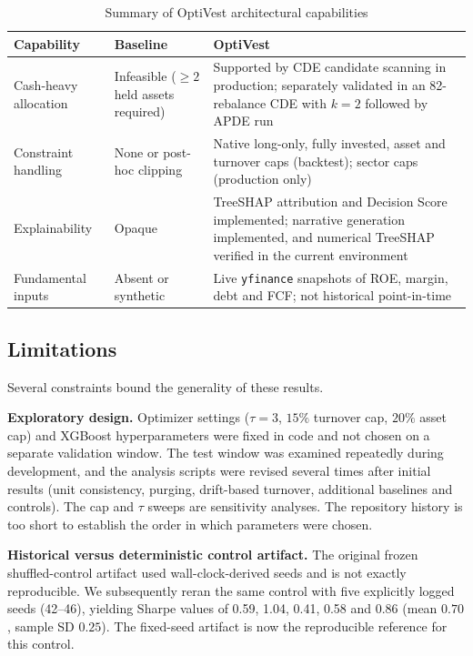 \documentclass[conference]{IEEEtran}
\begin{document}
\begin{table}[t]
\caption{Summary of OptiVest architectural capabilities}
\label{tab:capability}
\centering
\scriptsize
\setlength{\tabcolsep}{3pt}
\renewcommand{\arraystretch}{1.2}
\begin{tabular}{@{}>{\raggedright\arraybackslash}p{1.75cm}>{\raggedright\arraybackslash}p{1.75cm}>{\raggedright\arraybackslash}p{3.7cm}@{}}
\toprule
\textbf{Capability} & \textbf{Baseline} & \textbf{OptiVest} \\
\midrule
Cash-heavy allocation & Infeasible ($\ge 2$ held assets required) & Supported by CDE candidate scanning in production; separately validated in an 82-rebalance CDE with $k=2$ followed by APDE run \\
Constraint handling & None or post-hoc clipping & Native long-only, fully invested, asset and turnover caps (backtest); sector caps (production only) \\
Explainability & Opaque & TreeSHAP attribution and Decision Score implemented; narrative generation implemented, and numerical TreeSHAP verified in the current environment \\
Fundamental inputs & Absent or synthetic & Live \texttt{yfinance} snapshots of ROE, margin, debt and FCF; not historical point-in-time \\
\bottomrule
\end{tabular}
\end{table}

\subsection{Limitations}
\label{sec:limits}
Several constraints bound the generality of these results.

\textbf{Exploratory design.} Optimizer settings ($\tau=3$, $15\%$
turnover cap, $20\%$ asset cap) and XGBoost hyperparameters were fixed
in code and not chosen on a separate validation window. The test
window was examined repeatedly during development, and the analysis
scripts were revised several times after initial results (unit
consistency, purging, drift-based turnover, additional baselines and
controls). The cap and $\tau$ sweeps are sensitivity analyses. The
repository history is too short to establish the order in which
parameters were chosen.

\textbf{Historical versus deterministic control artifact.} The original
frozen shuffled-control artifact used wall-clock-derived seeds and is
not exactly reproducible. We subsequently reran the same control with
five explicitly logged seeds (42--46), yielding Sharpe values of 0.59,
1.04, 0.41, 0.58 and 0.86 (mean $0.70$, sample SD $0.25$). The fixed-seed
artifact is now the reproducible reference for this control.
\end{document}
